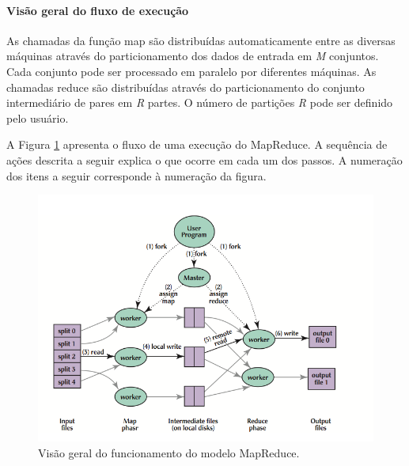 
\paragraph*{Visão geral do fluxo de execução}

As chamadas da função map são distribuídas automaticamente entre as diversas máquinas através do particionamento dos dados de entrada em \textit{M} conjuntos. Cada conjunto pode ser processado em paralelo por diferentes máquinas. As chamadas reduce são distribuídas através do particionamento do conjunto intermediário de pares em \textit{R} partes. O número de partições \textit{R} pode ser definido pelo usuário. 

A Figura \ref{fig:mapreduceoverview} apresenta o fluxo de uma execução do MapReduce. A sequência de ações descrita a seguir explica o que ocorre em cada um dos passos. A numeração dos itens a seguir corresponde à numeração da figura. 



 \begin{figure}[htb]
 \centering
\includegraphics[scale=.65]{figuras/MapReduceOverview.png} 
\caption{Visão geral do funcionamento do modelo MapReduce.}
\label{fig:mapreduceoverview}
\end{figure}



